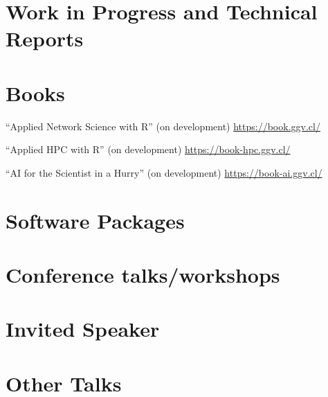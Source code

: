 \documentclass[letterpaper, 10pt]{article}
\begin{document}
\printbibliography[title=\vskip-20pt,keyword=published,resetnumbers=true]

\section*{Work in Progress and Technical Reports}

\printbibliography[title=\vskip-20pt,keyword=wip,resetnumbers=1]

\section*{Books}

\noindent ``Applied Network Science with R'' (on development) \url{https://book.ggv.cl/}

\noindent ``Applied HPC with R'' (on development) \url{https://book-hpc.ggv.cl/}

\noindent ``AI for the Scientist in a Hurry'' (on development) \url{https://book-ai.ggv.cl/}


\section*{Software Packages}

\begin{enumerate}[label={[}\arabic*{]},labelindent=5\parindent,labelsep=8pt]

\end{enumerate}


\section*{Conference talks/workshops}

\printbibliography[title=\vskip-20pt,keyword=conferencetalk, resetnumbers=true]


\section*{Invited Speaker}

\printbibliography[title=\vskip-20pt,keyword=invitedtalk, resetnumbers=true]

\section*{Other Talks}

\printbibliography[title=\vskip-20pt,keyword=othertalk, resetnumbers=true]
\end{document}
